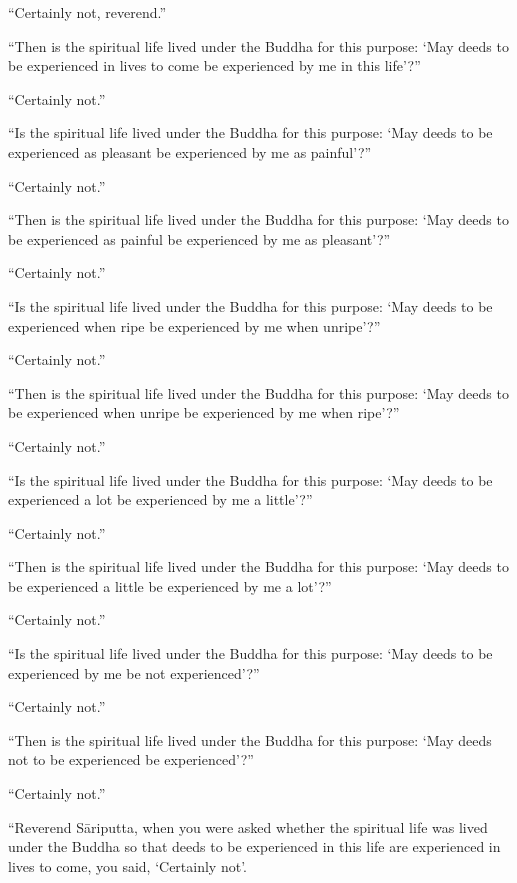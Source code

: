 \documentclass[12pt,openany]{book}%
\begin{document}
“Certainly not, reverend.” 

“Then is the spiritual life lived under the Buddha for this purpose: ‘May deeds to be experienced in lives to come be experienced by me in this life’?” 

“Certainly not.” 

“Is the spiritual life lived under the Buddha for this purpose: ‘May deeds to be experienced as pleasant be experienced by me as painful’?” 

“Certainly not.” 

“Then is the spiritual life lived under the Buddha for this purpose: ‘May deeds to be experienced as painful be experienced by me as pleasant’?” 

“Certainly not.” 

“Is the spiritual life lived under the Buddha for this purpose: ‘May deeds to be experienced when ripe be experienced by me when unripe’?” 

“Certainly not.” 

“Then is the spiritual life lived under the Buddha for this purpose: ‘May deeds to be experienced when unripe be experienced by me when ripe’?” 

“Certainly not.” 

“Is the spiritual life lived under the Buddha for this purpose: ‘May deeds to be experienced a lot be experienced by me a little’?” 

“Certainly not.” 

“Then is the spiritual life lived under the Buddha for this purpose: ‘May deeds to be experienced a little be experienced by me a lot’?” 

“Certainly not.” 

“Is the spiritual life lived under the Buddha for this purpose: ‘May deeds to be experienced by me be not experienced’?” 

“Certainly not.” 

“Then is the spiritual life lived under the Buddha for this purpose: ‘May deeds not to be experienced be experienced’?” 

“Certainly not.” 

“Reverend \textsanskrit{Sāriputta}, when you were asked whether the spiritual life was lived under the Buddha so that deeds to be experienced in this life are experienced in lives to come, you said, ‘Certainly not’. 
\end{document}
